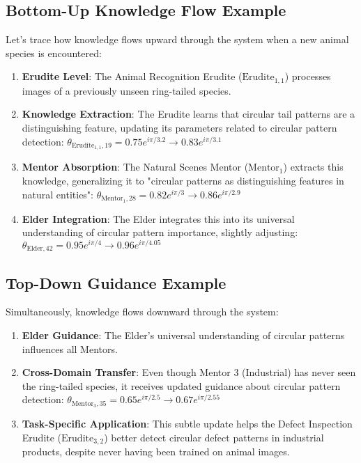 \subsection{Bottom-Up Knowledge Flow Example}

Let's trace how knowledge flows upward through the system when a new animal species is encountered:

\begin{enumerate}
    \item \textbf{Erudite Level}: The Animal Recognition Erudite ($\text{Erudite}_{1,1}$) processes images of a previously unseen ring-tailed species.
    
    \item \textbf{Knowledge Extraction}: The Erudite learns that circular tail patterns are a distinguishing feature, updating its parameters related to circular pattern detection: $\theta_{\text{Erudite}_{1,1},19} = 0.75e^{i\pi/3.2} \rightarrow 0.83e^{i\pi/3.1}$
    
    \item \textbf{Mentor Absorption}: The Natural Scenes Mentor ($\text{Mentor}_1$) extracts this knowledge, generalizing it to "circular patterns as distinguishing features in natural entities": $\theta_{\text{Mentor}_1,28} = 0.82e^{i\pi/3} \rightarrow 0.86e^{i\pi/2.9}$
    
    \item \textbf{Elder Integration}: The Elder integrates this into its universal understanding of circular pattern importance, slightly adjusting: $\theta_{\text{Elder},42} = 0.95e^{i\pi/4} \rightarrow 0.96e^{i\pi/4.05}$
\end{enumerate}

\subsection{Top-Down Guidance Example}

Simultaneously, knowledge flows downward through the system:

\begin{enumerate}
    \item \textbf{Elder Guidance}: The Elder's universal understanding of circular patterns influences all Mentors.
    
    \item \textbf{Cross-Domain Transfer}: Even though Mentor 3 (Industrial) has never seen the ring-tailed species, it receives updated guidance about circular pattern detection: $\theta_{\text{Mentor}_3,35} = 0.65e^{i\pi/2.5} \rightarrow 0.67e^{i\pi/2.55}$
    
    \item \textbf{Task-Specific Application}: This subtle update helps the Defect Inspection Erudite ($\text{Erudite}_{3,2}$) better detect circular defect patterns in industrial products, despite never having been trained on animal images.
\end{enumerate}

